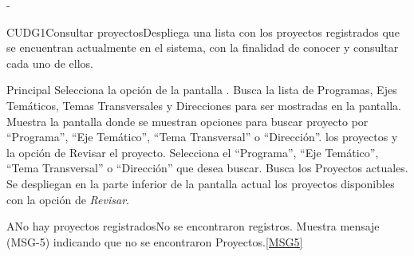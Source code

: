 -%

  \begin{UseCase}{CUDG1}{Consultar proyectos}{Despliega una lista con los proyectos registrados que se encuentran actualmente en el sistema, con la finalidad de conocer y consultar cada uno de ellos.}
  \end{UseCase}
  
  \begin{UCtrayectoria}{Principal}
    \UCpaso[\UCactor] Selecciona la opción  de la pantalla .
    \UCpaso Busca la lista de Programas, Ejes Temáticos, Temas Transversales y Direcciones para ser mostradas en la pantalla.
    \UCpaso Muestra la pantalla  donde se muestran opciones para buscar proyecto por ``Programa'', ``Eje Temático'', ``Tema Transversal'' o ``Dirección''. los proyectos y la opción de Revisar el proyecto.
    \UCpaso[\UCactor] Selecciona el ``Programa'', ``Eje Temático'', ``Tema Transversal'' o ``Dirección'' que desea buscar.
    \UCpaso Busca los Proyectos actuales.
    \UCpaso Se despliegan en la parte inferior de la pantalla actual los proyectos disponibles con la opción de \textit{Revisar}.  
  \end{UCtrayectoria}

  \begin{UCtrayectoriaA}{A}{No hay proyectos registrados}{No se encontraron registros.}
    \UCpaso Muestra mensaje (MSG-5) indicando que no se encontraron Proyectos.\ref{MSG5}
  \end{UCtrayectoriaA}

  

